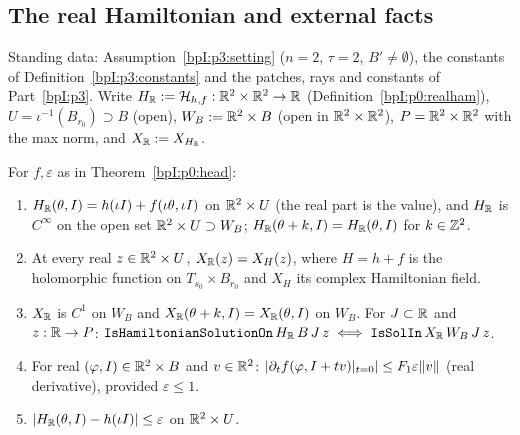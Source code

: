 \subsection{The real Hamiltonian and external facts}\label{bpI:p5:sec-real}

Standing data: Assumption~\ref{bpI:p3:setting} ($n=2$, $\tau=2$, $B'\ne\emptyset$), the constants of Definition~\ref{bpI:p3:constants} and the patches, rays and constants of
Part~\ref{bpI:p3}. Write $H_{\mathbb{R}}:=\mathcal H_{h,f}:\mathbb{R}^2\times\mathbb{R}^2\to\mathbb{R}$ (Definition~\ref{bpI:p0:realham}), $U=\iota^{-1}(B_{r_0})\supset B$ (open), $W_B:=\mathbb{R}^2\times B$ (open in $\mathbb{R}^2\times\mathbb{R}^2$),
$P=\mathbb{R}^2\times\mathbb{R}^2$ with the max norm, and $X_{\mathbb{R}}:=X_{H_{\mathbb{R}}}$.

\begin{lemma}\label{bpI:p5:real-ham}
For $f,\varepsilon$ as in Theorem~\ref{bpI:p0:head}:
\begin{enumerate}[label=(\alph*)]
\item $H_{\mathbb{R}}(\theta,I)=h(\iota I)+f(\iota\theta,\iota I)$ on $\mathbb{R}^2\times U$ (the real part is the value), and $H_{\mathbb{R}}$ is $C^\infty$ on the open set $\mathbb{R}^2\times U\supset W_B$; $H_{\mathbb{R}}(\theta+k,I)=H_{\mathbb{R}}(\theta,I)$ for $k\in\mathbb{Z}^2$.
\item At every real $z\in\mathbb{R}^2\times U$, $X_{\mathbb{R}}(z)=X_H(z)$, where $H=h+f$ is the holomorphic function on $T_{s_0}\times B_{r_0}$ and $X_H$ its complex Hamiltonian field.
\item $X_{\mathbb{R}}$ is $C^1$ on $W_B$ and $X_{\mathbb{R}}(\theta+k,I)=X_{\mathbb{R}}(\theta,I)$ on $W_B$. For $J\subset\mathbb{R}$ and $z:\mathbb{R}\to P$:
$\texttt{IsHamiltonianSolutionOn}\,H_{\mathbb{R}}\,B\,J\,z\iff\texttt{IsSolIn}\,X_{\mathbb{R}}\,W_B\,J\,z$.
\item For real $(\varphi,I)\in\mathbb{R}^2\times B$ and $v\in\mathbb{R}^2$: $\lvert \partial_t f(\varphi,I+tv)|_{t=0}\rvert\le F_1\varepsilon\lVert v\rVert$ (real derivative), provided $\varepsilon\le1$.
\item $\lvert H_{\mathbb{R}}(\theta,I)-h(\iota I)\rvert\le\varepsilon$ on $\mathbb{R}^2\times U$.
\end{enumerate}
\end{lemma}

